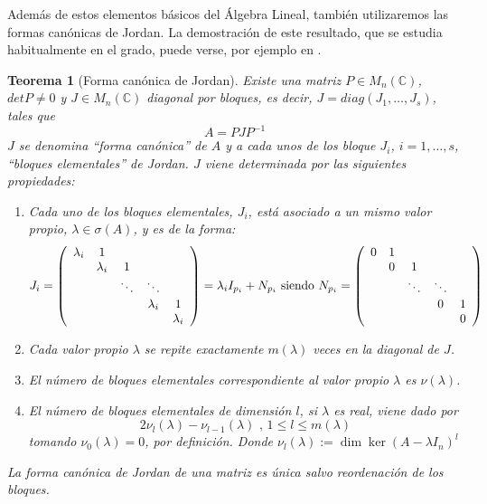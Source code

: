 \documentclass[size=a4, parskip=half, titlepage=false, toc=flat, toc=bib, 12pt, twoside]{scrartcl}
\theoremstyle{theorem-style}
\newtheorem{nth}{Teorema}[section]
\theoremstyle{definition-style}
\theoremstyle{remark-style}
\theoremstyle{example-style}
\theoremstyle{definition-style}
\theoremstyle{remark-style}
\begin{document}
Además de estos elementos básicos del Álgebra Lineal, también utilizaremos las formas canónicas de Jordan. La demostración de este resultado, que se estudia habitualmente en el grado, puede verse, por ejemplo en \cite{jordan}.

\begin{nth}[Forma canónica de Jordan]
Existe una matriz $P \in M_n(\mathbb{C})$, $det P \neq 0$ y $J \in M_n(\mathbb{C})$ diagonal por bloques, es decir, $J = diag(J_1, \dots, J_s)$, tales que
$$A = P J P^{-1} $$
$J$ se denomina ``forma canónica'' de $A$ y a cada unos de los bloque $J_i$, $i = 1, \dots, s$,  ``bloques elementales'' de Jordan. $J$ viene determinada por las siguientes propiedades:
\begin{enumerate}
\item Cada uno de los bloques elementales, $J_i$, está asociado a un mismo valor propio, $\lambda \in \sigma(A)$, y es de la forma:
$$J_i = \left(
      \begin{array}{{ccccc}}
        \lambda_i   &   1       &         &    & \\
              &    \lambda_i    &    1     &    & \\
              &           & \ddots  &  \ddots   & \\
              &           &         & \lambda_i & 1 \\
              &           &         &           & \lambda_i
      \end{array}
\right) = \lambda_i I_{p_i} + N_{p_i} \textrm{ siendo } N_{p_i} = \left(
      \begin{array}{{ccccc}}
            0   &   1       &         &    & \\
              &    0    &    1     &    & \\
              &           & \ddots  &  \ddots   & \\
              &           &         & 0 & 1 \\
              &           &         &           & 0
      \end{array}
\right)$$
\item Cada valor propio $\lambda$ se repite exactamente $m(\lambda)$ veces en la diagonal de $J$.
\item El número de bloques elementales correspondiente al valor propio $\lambda$ es $\nu(\lambda)$.
\item El número de bloques elementales de dimensión $l$, si $\lambda$ es real, viene dado por
$$2 \nu_l(\lambda) - \nu_{l-1}(\lambda) \textrm{ , } 1 \leq l \leq m(\lambda)$$
tomando $\nu_0(\lambda) = 0$, por definición. Donde $\nu_l(\lambda) := \dim  \ker(A - \lambda I_n)^l $
\end{enumerate}
La forma canónica de Jordan de una matriz es única salvo reordenación de los bloques.
\end{nth}
\end{document}
